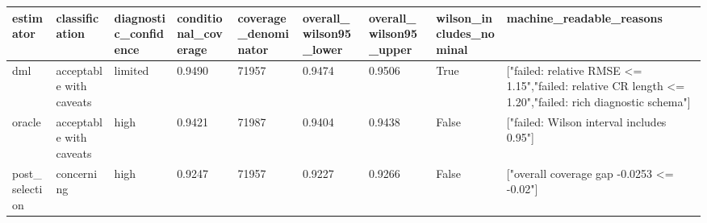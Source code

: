 \begin{tabular}{lllllllll}
\hline
estimator & classification & diagnostic\_confidence & conditional\_coverage & coverage\_denominator & overall\_wilson95\_lower & overall\_wilson95\_upper & wilson\_includes\_nominal & machine\_readable\_reasons \\
\hline
dml & acceptable with caveats & limited & 0.9490 & 71957 & 0.9474 & 0.9506 & True & ["failed: relative RMSE <= 1.15","failed: relative CR length <= 1.20","failed: rich diagnostic schema"] \\
oracle & acceptable with caveats & high & 0.9421 & 71987 & 0.9404 & 0.9438 & False & ["failed: Wilson interval includes 0.95"] \\
post\_selection & concerning & high & 0.9247 & 71957 & 0.9227 & 0.9266 & False & ["overall coverage gap -0.0253 <= -0.02"] \\
\hline
\end{tabular}
